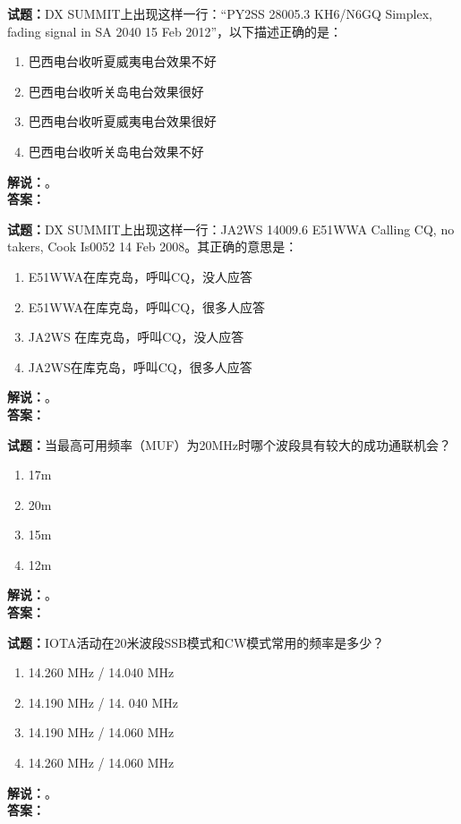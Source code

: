 \documentclass{ctexbook}
\begin{document}
\bigskip




\noindent\textbf{试题：}DX SUMMIT上出现这样一行：“PY2SS 28005.3 KH6/N6GQ Simplex, fading signal in SA 2040 15 Feb 2012”，以下描述正确的是：
\begin{enumerate}[leftmargin=3em]
\item 巴西电台收听夏威夷电台效果不好
\item 巴西电台收听关岛电台效果很好
\item 巴西电台收听夏威夷电台效果很好
\item 巴西电台收听关岛电台效果不好
\end{enumerate}
\noindent\textbf{解说：}\textbf{}。\\\noindent\textbf{答案：}

\bigskip




\noindent\textbf{试题：}DX SUMMIT上出现这样一行：JA2WS 14009.6 E51WWA Calling CQ, no takers, Cook Is0052 14 Feb 2008。其正确的意思是：
\begin{enumerate}[leftmargin=3em]
\item E51WWA在库克岛，呼叫CQ，没人应答
\item E51WWA在库克岛，呼叫CQ，很多人应答
\item JA2WS 在库克岛，呼叫CQ，没人应答
\item JA2WS在库克岛，呼叫CQ，很多人应答
\end{enumerate}
\noindent\textbf{解说：}\textbf{}。\\\noindent\textbf{答案：}

\bigskip




\noindent\textbf{试题：}当最高可用频率（MUF）为20\unit{\MHz}时哪个波段具有较大的成功通联机会？
\begin{enumerate}[leftmargin=3em]
\item 17m
\item 20m
\item 15m
\item 12m
\end{enumerate}
\noindent\textbf{解说：}\textbf{}。\\\noindent\textbf{答案：}

\bigskip




\noindent\textbf{试题：}IOTA活动在20米波段SSB模式和CW模式常用的频率是多少？
\begin{enumerate}[leftmargin=3em]
\item 14.260 \unit{\MHz} / 14.040 \unit{\MHz}
\item 14.190 \unit{\MHz} / 14. 040 \unit{\MHz}
\item 14.190 \unit{\MHz} / 14.060 \unit{\MHz}
\item 14.260 \unit{\MHz} / 14.060 \unit{\MHz}
\end{enumerate}
\noindent\textbf{解说：}\textbf{}。\\\noindent\textbf{答案：}
\end{document}
